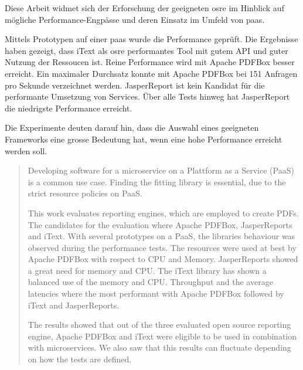 \documentclass[main.tex]{subfiles}
\begin{document}

\begin{zusammenfassung}

\noindent
Diese Arbeit widmet sich der Erforschung der geeigneten \acrfull{osre} im Hinblick auf mögliche Performance-Engpässe und deren Einsatz im Umfeld von \acrfull{paas}. 

\noindent
Mittels Prototypen auf einer \acrshort{paas} wurde die Performance geprüft. 
\noindent
Die Ergebnisse haben gezeigt, dass iText als \acrlong{osre} performantes Tool mit gutem API und guter Nutzung der Ressoucen ist. Reine Performance wird mit Apache PDFBox besser erreicht. Ein maximaler Durchsatz konnte mit Apache PDFBox bei 151 Anfragen pro Sekunde verzeichnet werden. JasperReport ist kein Kandidat für die performante Umsetzung von Services. Über alle Tests hinweg hat JasperReport die niedrigste Performance erreicht.

\noindent
Die Experimente deuten darauf hin, dass die Auswahl eines geeigneten Frameworks eine grosse Bedeutung hat, wenn eine hohe Performance erreicht werden soll.




\end{zusammenfassung}



\begin{abstract}
\selectlanguage{\english}
Developing software for a microservice on a Plattform as a Service (PaaS) is a common use case. 
Finding the fitting library is essential, due to the strict resource policies on PaaS.

This work evaluates reporting engines, which are employed to create PDFs. The candidates for the evaluation where Apache PDFBox, JasperReports and iText. With several prototypes on a PaaS, the libraries behaviour was observed during the performance tests.
The resources were used at best by Apache PDFBox with respect to CPU and Memory. JasperReports showed a great need for memory and CPU. The iText library has shown a balanced use of the memory and CPU. Throughput and the average latencies where the most performant with Apache PDFBox followed by iText and JasperReports. 

The results showed that out of the three evaluated open source reporting engine, Apache PDFBox and iText were eligible to be used in combination with microservices. We also saw that this results can fluctuate depending on how the tests are defined.
\end{abstract}
\end{document}
